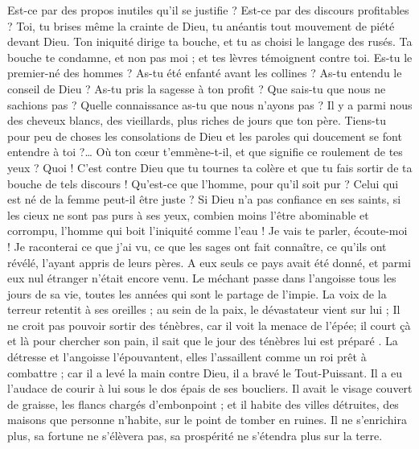 \begin{multicols}{2}
Est-ce par des propos inutiles qu'il se justifie ? Est-ce par des discours profitables ?
Toi, tu brises même la crainte de Dieu, tu anéantis tout mouvement de piété devant Dieu.
Ton iniquité dirige ta bouche, et tu as choisi le langage des rusés.
Ta bouche te condamne, et non pas moi ; et tes lèvres témoignent contre toi.
Es-tu le premier-né des hommes ? As-tu été enfanté avant les collines ?
As-tu entendu le conseil de Dieu ? As-tu pris la sagesse à ton profit ?
Que sais-tu que nous ne sachions pas ? Quelle connaissance as-tu que nous n'ayons pas ?
Il y a parmi nous des cheveux blancs, des vieillards, plus riches de jours que ton père.
Tiens-tu pour peu de choses les consolations de Dieu et les paroles qui doucement se font entendre à toi ?…
Où ton cœur t'emmène-t-il, et que signifie ce roulement de tes yeux ?
Quoi ! C'est contre Dieu que tu tournes ta colère et que tu fais sortir de ta bouche de tels discours !
Qu'est-ce que l'homme, pour qu'il soit pur ? Celui qui est né de la femme peut-il être juste ?
Si Dieu n'a pas confiance en ses saints, si les cieux ne sont pas purs à ses yeux,
combien moins l'être abominable et corrompu, l'homme qui boit l'iniquité comme l'eau !
Je vais te parler, écoute-moi ! Je raconterai ce que j'ai vu,
ce que les sages ont fait connaître, ce qu'ils ont révélé, l'ayant appris de leurs pères.
A eux seuls ce pays avait été donné, et parmi eux nul étranger n'était encore venu.
Le méchant passe dans l'angoisse tous les jours de sa vie, toutes les années qui sont le partage de l'impie.
La voix de la terreur retentit à ses oreilles ; au sein de la paix, le dévastateur vient sur lui ;
Il ne croit pas pouvoir sortir des ténèbres, car il voit la menace de   l’épée;
il court çà et là pour chercher son pain, il sait que le jour des ténèbres lui est préparé .
La détresse et l'angoisse l'épouvantent, elles l'assaillent comme un roi prêt à combattre ;
car il a levé la main contre Dieu, il a bravé le Tout-Puissant.
Il a eu l'audace de courir à lui sous le dos épais de ses boucliers.
Il avait le visage couvert de graisse, les flancs chargés d'embonpoint ;
et il habite des villes détruites, des maisons que personne n'habite, sur le point de tomber en ruines.
Il ne s'enrichira plus, sa fortune ne s'élèvera pas, sa prospérité ne s'étendra plus sur la terre.

\end{multicols}
